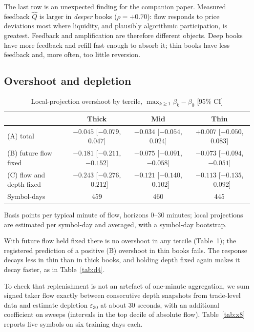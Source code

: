 The last row is an unexpected finding for the companion paper. Measured feedback $\hat Q$ is larger in \emph{deeper} books ($\rho=+0.70$): flow responds to price deviations most where liquidity, and plausibly algorithmic participation, is greatest. Feedback and amplification are therefore different objects. Deep books have more feedback and refill fast enough to absorb it; thin books have less feedback and, more often, too little reversion.

\subsection{Overshoot and depletion}

\begin{table}[t]\centering\small
\begin{threeparttable}
\caption{Local-projection overshoot by tercile, $\max_{k\ge1}\beta_k-\beta_0$ [95\% CI]}\label{tab:x4}
\setlength{\tabcolsep}{3pt}
\begin{tabular}{lccc}
\toprule
 & Thick & Mid & Thin\\
\midrule
(A) total & $-0.045$ [$-0.079$, $0.047$] & $-0.034$ [$-0.054$, $0.024$] & $+0.007$ [$-0.050$, $0.083$]\\
(B) future flow fixed & $-0.181$ [$-0.211$, $-0.152$] & $-0.075$ [$-0.091$, $-0.058$] & $-0.073$ [$-0.094$, $-0.051$]\\
(C) flow and depth fixed & $-0.243$ [$-0.276$, $-0.212$] & $-0.121$ [$-0.140$, $-0.102$] & $-0.113$ [$-0.135$, $-0.092$]\\
Symbol-days & 459 & 460 & 445\\
\bottomrule
\end{tabular}
\begin{tablenotes}\footnotesize\item Basis points per typical minute of flow, horizons 0--30 minutes; local projections are estimated per symbol-day and averaged, with a symbol-day bootstrap. \end{tablenotes}
\end{threeparttable}
\end{table}

With future flow held fixed there is no overshoot in any tercile (Table~\ref{tab:x4}); the registered prediction of a positive (B) overshoot in thin books fails. The response decays less in thin than in thick books, and holding depth fixed again makes it decay faster, as in Table~\ref{tab:d4}.

To check that replenishment is not an artefact of one-minute aggregation, we sum signed taker flow exactly between consecutive depth snapshots from trade-level data and estimate depletion $\varepsilon_{30}$ at about 30 seconds, with an additional coefficient on sweeps (intervals in the top decile of absolute flow). Table~\ref{tab:x8} reports five symbols on six training days each.

